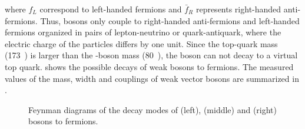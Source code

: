 where $f_{L}$ correspond to left-handed fermions and $\bar{f}_{R}$ represents right-handed anti-fermions. Thus, {\PW} bosons only couple to right-handed anti-fermions and left-handed fermions organized in pairs of lepton-neutrino or quark-antiquark, where the electric charge of the particles differs by one unit. Since the top-quark mass (173~\GeVcc) is larger than the \Wb-boson mass (80~\GeVcc), the \Wb boson can not decay to a virtual top quark.  shows the possible decays of weak bosons to fermions. The measured values of the mass, width and couplings of weak vector bosons are summarized in .

\begin{figure}[htbp]
  \vspace{10mm}
  \centering
  \hspace*{1cm}
  \hspace*{1cm}
  \vspace{4mm}
  \caption{Feynman diagrams of the decay modes of \Wp (left), \Wm (middle) and \Z (right) bosons to fermions.}
  \label{dia:WDecays}
\end{figure}

